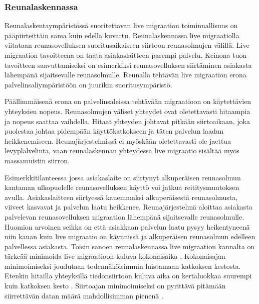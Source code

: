 \subsubsection*{Reunalaskennassa}
Reunalaskentaympäristössä suoritettavan live migraation toiminnallisuus on pääpiirteittäin sama kuin edellä kuvattu.
Reunalaskennassa live migraatiolla viitataan reunasovelluksen suoritusaikaiseen siirtoon reunasolmujen välillä.
Live migraation tavoitteena on taata asiakaslaitteen parempi palvelu.
Keinona tuon tavoitteen saavuttamiseksi on esimerkiksi reunasovelluksen siirtäminen asiakasta lähempänä sijaitsevalle reunasolmulle. Reunalla tehtävän live migraation erona palvelinsaliympäristöön on juurikin suoritusympäristö. 

Päällimmäisenä erona on palvelinsaleissa tehtävään migraatioon on käytettävien yhteyksien nopeus. Reunasolmujen väliset yhteydet ovat oletettavasti hitaampia ja nopeus saattaa vaihdella\cite{ha2017you}.
Hitaat yhteyden johtavat pitkään siirtoaikaan, joka puolestaa johtaa pidempään käyttökatkokseen ja täten palvelun laadun heikkenemiseen. 
Reunajärjestelmissä ei myöskään oletettavasti ole jaettua levyplalvelinta, vaan reunalaskennan yhteydessä live migraatio sisältää myös massamuistin siirron.

Esimerkkitilanteessa jossa asiakaslaite on siirtynyt alkuperäisen reunasolmun kantaman ulkopuolelle reunasovelluksen käyttö voi jatkua reititysmuutoksen avulla. Asiakaslaitteen siirtyessä kauemmaksi alkuperäisestä reunasolmusta, viiveet kasvavat ja palvelun laatu heikkenee. Reunajärjestelmä aloittaa asiakasta palvelevan reunasovelluksen migraation lähempänä sijaitsevalle reunasolmulle.
Huomion arvoinen seikka on että asiakkaan palvelun laatu pysyy heikentyneenä niin kauan kuin live migraatio on käynnissä ja alkuperäisen reunasolmun edelleen palvellessa asiakasta. 
Toisin sanoen reunalaskennassa live migraation kannalta on tärkeää minimoida live migraatioon kuluva kokonaisaika \cite{ha2015adaptive}. 
Kokonaisajan minimoimiseksi joudutaan todennäköisimmin luistamaan katkoksen kestosta. 
Etenkin hitailla yhteyksillä tiedonsiirtoon kuluva aika on kertaluokkaa suurempi kuin katkoksen kesto \cite{ha2017you}.
Siirtoajan minimoimiseksi on pyrittävä pitämään siirrettävän datan määrä mahdollisimman pienenä \cite{ha2015adaptive}.





